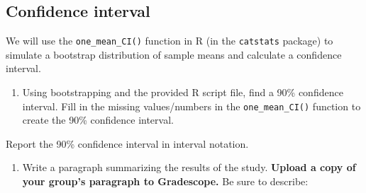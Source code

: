 \documentclass[
]{report}
\newenvironment{Shaded}{\begin{snugshade}}{\end{snugshade}}
\newcommand{\AttributeTok}[1]{\textcolor[rgb]{0.13,0.29,0.53}{#1}}
\newcommand{\CommentTok}[1]{\textcolor[rgb]{0.56,0.35,0.01}{\textit{#1}}}
\newcommand{\DecValTok}[1]{\textcolor[rgb]{0.00,0.00,0.81}{#1}}
\newcommand{\FunctionTok}[1]{\textcolor[rgb]{0.13,0.29,0.53}{\textbf{#1}}}
\newcommand{\NormalTok}[1]{#1}
\newcommand{\SpecialCharTok}[1]{\textcolor[rgb]{0.81,0.36,0.00}{\textbf{#1}}}
\newcommand{\StringTok}[1]{\textcolor[rgb]{0.31,0.60,0.02}{#1}}
\providecommand{\tightlist}{%
  \setlength{\itemsep}{0pt}\setlength{\parskip}{0pt}}
\begin{document}
\vspace{0.8in}

\subsection*{Confidence interval}\label{confidence-interval}

We will use the \texttt{one\_mean\_CI()} function in R (in the \texttt{catstats} package) to simulate a bootstrap distribution of sample means and calculate a confidence interval.

\begin{enumerate}
\def\labelenumi{\arabic{enumi}.}
\setcounter{enumi}{11}
\tightlist
\item
  Using bootstrapping and the provided R script file, find a 90\% confidence interval. Fill in the missing values/numbers in the \texttt{one\_mean\_CI()} function to create the 90\% confidence interval.
\end{enumerate}

\begin{Shaded}
\end{Shaded}

Report the 90\% confidence interval in interval notation.

\vspace{0.3in}

\newpage

\begin{enumerate}
\def\labelenumi{\arabic{enumi}.}
\setcounter{enumi}{12}
\tightlist
\item
  Write a paragraph summarizing the results of the study. \textbf{Upload a copy of your group's paragraph to Gradescope.} Be sure to describe:
\end{enumerate}
\end{document}
